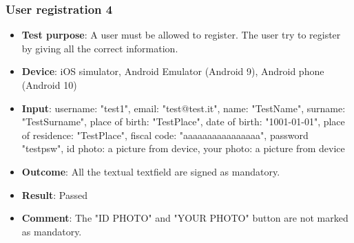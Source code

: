 \documentclass[../ATD.tex]{subfiles}
\begin{document}
    \subsubsection{User registration 4}\label{subsubsec:user-registration-4}
    \begin{itemize}
        \item \textbf{Test purpose}: A user must be allowed to register.
        The user try to register by giving all the correct information.
        \item \textbf{Device}: iOS simulator, Android Emulator (Android 9), Android phone (Android 10)
        \item \textbf{Input}: username: "test1", email: "test@test.it", name: "TestName", surname: "TestSurname", place of birth: "TestPlace", date of birth: "1001-01-01", place of residence: "TestPlace", fiscal code: "aaaaaaaaaaaaaaaa", password "testpsw", id photo: a picture from device, your photo: a picture from device
        \item \textbf{Outcome}: All the textual textfield are signed as mandatory.
        \item \textbf{Result}: Passed
        \item \textbf{Comment}: The "ID PHOTO" and "YOUR PHOTO" button are not marked as mandatory.


\end{itemize}
\end{document}
